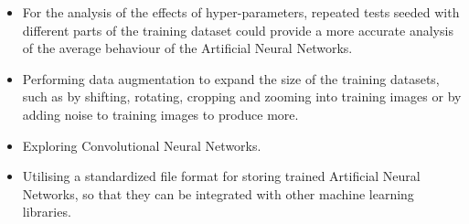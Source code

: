 \documentclass[./project-report/src/latex/project-report.tex]{subfiles}
\begin{document}
\begin{itemize}
    \item For the analysis of the effects of hyper-parameters, repeated tests seeded with different parts of the training dataset could provide a more accurate 
          analysis of the average behaviour of the Artificial Neural Networks.
    \item Performing data augmentation to expand the size of the training datasets, such as by shifting, rotating, cropping and zooming into training images or by 
          adding noise to training images to produce more.
    \item Exploring Convolutional Neural Networks.
    \item Utilising a standardized file format for storing trained Artificial Neural Networks, so that they can be integrated with other machine learning libraries.
\end{itemize}
\end{document}

